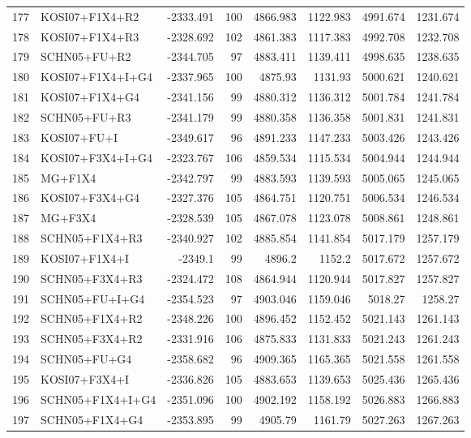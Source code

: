 \begin{longtable}{clrrrrrr}
	177 & KOSI07+F1X4+R2 & -2333.491 & 100 & 4866.983 & 1122.983 & 4991.674 & 1231.674 \\ 
	178 & KOSI07+F1X4+R3 & -2328.692 & 102 & 4861.383 & 1117.383 & 4992.708 & 1232.708 \\ 
	179 & SCHN05+FU+R2 & -2344.705 & 97 & 4883.411 & 1139.411 & 4998.635 & 1238.635 \\ 
	180 & KOSI07+F1X4+I+G4 & -2337.965 & 100 & 4875.93 & 1131.93 & 5000.621 & 1240.621 \\ 
	181 & KOSI07+F1X4+G4 & -2341.156 & 99 & 4880.312 & 1136.312 & 5001.784 & 1241.784 \\ 
	182 & SCHN05+FU+R3 & -2341.179 & 99 & 4880.358 & 1136.358 & 5001.831 & 1241.831 \\ 
	183 & KOSI07+FU+I & -2349.617 & 96 & 4891.233 & 1147.233 & 5003.426 & 1243.426 \\ 
	184 & KOSI07+F3X4+I+G4 & -2323.767 & 106 & 4859.534 & 1115.534 & 5004.944 & 1244.944 \\ 
	185 & MG+F1X4 & -2342.797 & 99 & 4883.593 & 1139.593 & 5005.065 & 1245.065 \\ 
	186 & KOSI07+F3X4+G4 & -2327.376 & 105 & 4864.751 & 1120.751 & 5006.534 & 1246.534 \\ 
	187 & MG+F3X4 & -2328.539 & 105 & 4867.078 & 1123.078 & 5008.861 & 1248.861 \\ 
	188 & SCHN05+F1X4+R3 & -2340.927 & 102 & 4885.854 & 1141.854 & 5017.179 & 1257.179 \\ 
	189 & KOSI07+F1X4+I & -2349.1 & 99 & 4896.2 & 1152.2 & 5017.672 & 1257.672 \\ 
	190 & SCHN05+F3X4+R3 & -2324.472 & 108 & 4864.944 & 1120.944 & 5017.827 & 1257.827 \\ 
	191 & SCHN05+FU+I+G4 & -2354.523 & 97 & 4903.046 & 1159.046 & 5018.27 & 1258.27 \\ 
	192 & SCHN05+F1X4+R2 & -2348.226 & 100 & 4896.452 & 1152.452 & 5021.143 & 1261.143 \\ 
	193 & SCHN05+F3X4+R2 & -2331.916 & 106 & 4875.833 & 1131.833 & 5021.243 & 1261.243 \\ 
	194 & SCHN05+FU+G4 & -2358.682 & 96 & 4909.365 & 1165.365 & 5021.558 & 1261.558 \\ 
	195 & KOSI07+F3X4+I & -2336.826 & 105 & 4883.653 & 1139.653 & 5025.436 & 1265.436 \\ 
	196 & SCHN05+F1X4+I+G4 & -2351.096 & 100 & 4902.192 & 1158.192 & 5026.883 & 1266.883 \\ 
	197 & SCHN05+F1X4+G4 & -2353.895 & 99 & 4905.79 & 1161.79 & 5027.263 & 1267.263 \\ 

\end{longtable}
